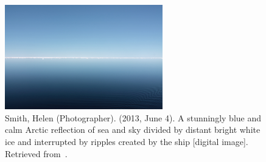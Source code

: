 %
%
%
\begin{figure}
\centering
\includegraphics[width=0.61\textwidth]{figures/helen-smith-arcticsea.jpg}
\caption{
	Smith, Helen (Photographer).
	(2013, June 4).
	A stunningly blue and calm Arctic reflection of sea and sky divided by distant
	bright white ice and interrupted by ripples created by the ship [digital image].
	Retrieved from~\citet{misc:noaa:arctic}.
	}
\label{fig:ocean:arctic}
\end{figure}
